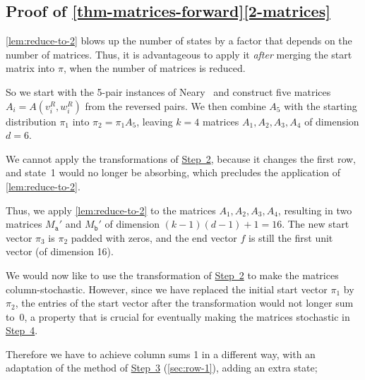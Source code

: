 \documentclass[a4paper,cleveref, autoref, thm-restate]{lipics-v2021}
\begin{document}
\subsection{Proof of \autoref{thm-matrices-forward}\ref{2-matrices} }
\autoref{lem:reduce-to-2} blows up the number of states by a factor
that
depends on the number of matrices. Thus, it is advantageous to apply
it \emph{after} merging the start matrix into $\pi$, when the number of
matrices is reduced.

So we start with
the 5-pair instances of Neary~\cite{neary:PCP5:2015}
and construct five matrices
$A_i=A(v_i^R,w_i^R)$ from the reversed pairs.
We then
combine $A_5$ with the starting
distribution $\pi_1$ into $\pi_2 = \pi_1A_5$,
leaving $k=4$ matrices $A_1,A_2,A_3,A_4$ of
 dimension $d=6$. %

 We cannot apply the transformations of \hyperref[sec:step2]{Step~2},
because it changes the first row, and state~1 would no longer be
absorbing, which precludes the application of \autoref{lem:reduce-to-2}.
 
Thus, we apply
\autoref{lem:reduce-to-2} to
the matrices $A_1,A_2,A_3,A_4$,
resulting in two matrices
$M_{\mathtt{a}}'$ and
 $M_{\mathtt{b}}'$
 of dimension
 $(k-1)(d-1)+1=16$.
 The new start vector $\pi_3$ is $\pi_2$ padded with zeros,
 and the end vector $f$ is still the first unit vector (of dimension 16).

We would now like to use the transformation of \hyperref[sec:step2]{Step~2} to make
the matrices column-stochastic.
However, since we have replaced the initial
start vector $\pi_1$ by $\pi_2$,
the entries of the start vector
after the transformation 
would not longer sum to~0, a property that is
crucial for eventually making the matrices stochastic in \hyperref[sec:step4]{Step~4}.

Therefore we have to achieve column sums 1
in a different way, with
an adaptation of the method of \hyperref[sec:step3]
{Step~3} (\autoref{sec:row-1}),
adding an extra state;
 
\end{document}
